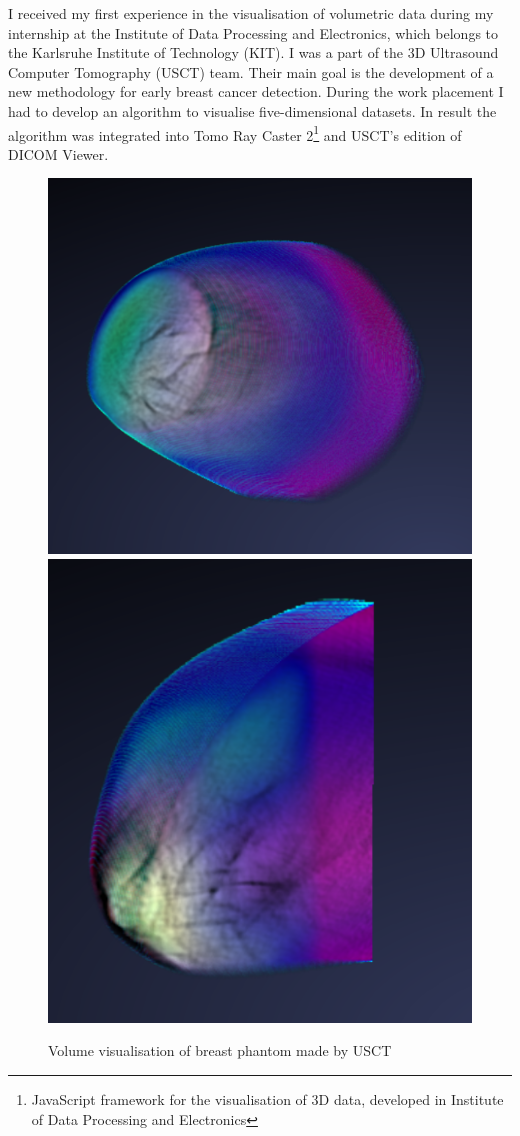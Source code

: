 \documentclass[english, 11pt]{report}
\begin{document}
I received my first experience in the visualisation of volumetric data during my internship at the Institute of Data Processing and Electronics, which belongs to the Karlsruhe Institute of Technology (KIT). I was a part of the 3D Ultrasound Computer Tomography (USCT) team. Their main goal is the development of a new methodology for early breast cancer detection. During the work placement I had to develop an algorithm to visualise five-dimensional datasets. In result the algorithm was integrated into Tomo Ray Caster 2\footnote{JavaScript framework for the visualisation of 3D data, developed in Institute of Data Processing and Electronics} and USCT's edition of DICOM Viewer.\\

\begin{figure}[H]
\includegraphics[scale=0.4]{img/usct1}\includegraphics[scale=0.4335]{img/usct2}\\
\caption{Volume visualisation of breast phantom made by USCT}
\end{figure}
\end{document}
